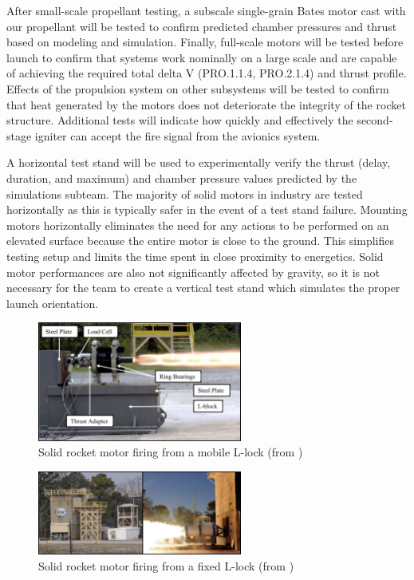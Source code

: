 After small-scale propellant testing, a subscale single-grain Bates motor cast with our propellant will be tested to confirm predicted chamber pressures and thrust based on modeling and simulation. Finally, full-scale motors will be tested before launch to confirm that systems work nominally on a large scale and are capable of achieving the required total delta V (PRO.1.1.4, PRO.2.1.4) and thrust profile. Effects of the propulsion system on other subsystems will be tested to confirm that heat generated by the motors does not deteriorate the integrity of the rocket structure. Additional tests will indicate how quickly and effectively the second-stage igniter can accept the fire signal from the avionics system.

A horizontal test stand will be used to experimentally verify the thrust (delay, duration, and maximum) and chamber pressure values predicted by the simulations subteam. The majority of solid motors in industry are tested horizontally as this is typically safer in the event of a test stand failure. Mounting motors horizontally eliminates the need for any actions to be performed on an elevated surface because the entire motor is close to the ground. This simplifies testing setup and limits the time spent in close proximity to energetics. Solid motor performances are also not significantly affected by gravity, so it is not necessary for the team to create a vertical test stand which simulates the proper launch orientation.

\begin{figure}
    \centering
    \includegraphics[width=0.6\textwidth]{images/srm-mobile-lblock}
    \caption{Solid rocket motor firing from a mobile L-lock (from \cite{uah-thesis})}
    \label{figure:lblock1}
\end{figure}

\begin{figure}
    \centering
    \includegraphics[width=0.6\textwidth]{images/srm-firing}
    \caption{Solid rocket motor firing from a fixed L-lock (from \cite{uah-thesis})}
    \label{figure:lblock2}
\end{figure}

